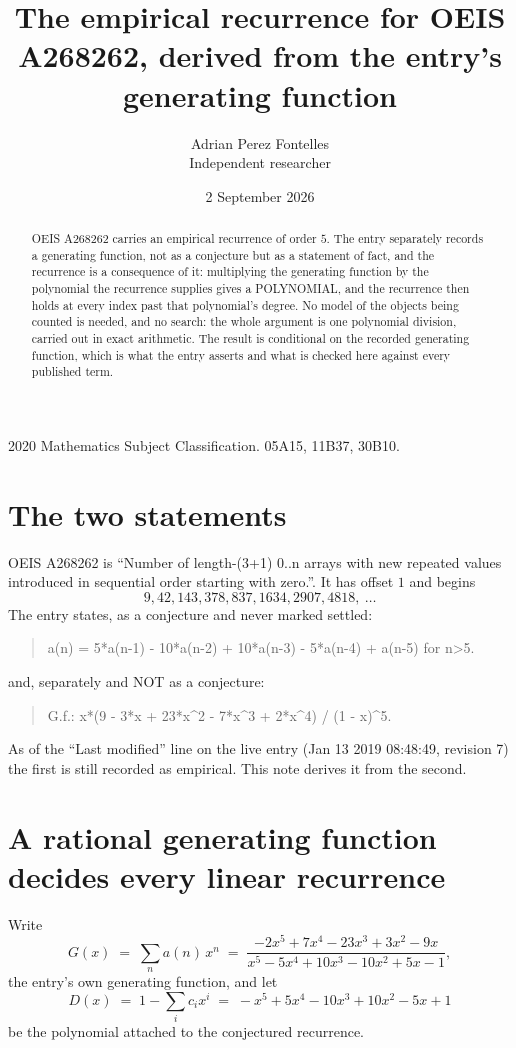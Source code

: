 \documentclass[11pt,a4paper]{article}
\title{The empirical recurrence for OEIS A268262, derived from the entry's generating function}
\author{Adrian Perez Fontelles\\ \small Independent researcher}
\date{2 September 2026}
\theoremstyle{plain}
\theoremstyle{definition}
\begin{document}
\maketitle

\begin{abstract}
OEIS A268262 carries an empirical recurrence of order $5$. The entry separately records a
generating function, not as a conjecture but as a statement of fact, and the recurrence is a
consequence of it: multiplying the generating function by the polynomial the recurrence
supplies gives a POLYNOMIAL, and the recurrence then holds at every index past that
polynomial's degree. No model of the objects being counted is needed, and no search: the
whole argument is one polynomial division, carried out in exact arithmetic. The result is
conditional on the recorded generating function, which is what the entry asserts and what is
checked here against every published term.
\end{abstract}

\noindent\small 2020 Mathematics Subject Classification. 05A15, 11B37, 30B10.\normalsize

\section{The two statements}

OEIS A268262 is ``Number of length-(3+1) 0..n arrays with new repeated values introduced in sequential order starting with zero.''. It has offset $1$ and begins
\[
9, 42, 143, 378, 837, 1634, 2907, 4818,\ \dots
\]
The entry states, as a conjecture and never marked settled:
\begin{quote}
a(n) = 5*a(n-1) - 10*a(n-2) + 10*a(n-3) - 5*a(n-4) + a(n-5) for n>5.
\end{quote}
and, separately and NOT as a conjecture:
\begin{quote}
G.f.: x*(9 - 3*x + 23*x\^{}2 - 7*x\^{}3 + 2*x\^{}4) / (1 - x)\^{}5.
\end{quote}
As of the ``Last modified'' line on the live entry (Jan 13 2019 08:48:49, revision 7) the first is still
recorded as empirical. This note derives it from the second.

\section{A rational generating function decides every linear recurrence}

Write
\[
G(x)\;=\;\sum_{n}a(n)\,x^{n}\;=\;\frac{- 2 x^{5} + 7 x^{4} - 23 x^{3} + 3 x^{2} - 9 x}{x^{5} - 5 x^{4} + 10 x^{3} - 10 x^{2} + 5 x - 1},
\]
the entry's own generating function, and let
\[
D(x)\;=\;1-\sum_i c_i x^{i}\;=\;- x^{5} + 5 x^{4} - 10 x^{3} + 10 x^{2} - 5 x + 1
\]
be the polynomial attached to the conjectured recurrence.
\end{document}

